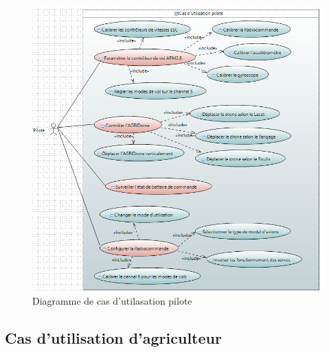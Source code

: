 		\begin{figure}[h] 
		\begin{center} 
			\centering
		\includegraphics{Images/Diagramme de cas d'utilisation pilote}
		\end{center}
		
		\caption{Diagramme de cas d'utilasation pilote}
		\end{figure}
	
		\subsection{Cas d'utilisation d'agriculteur }
		
